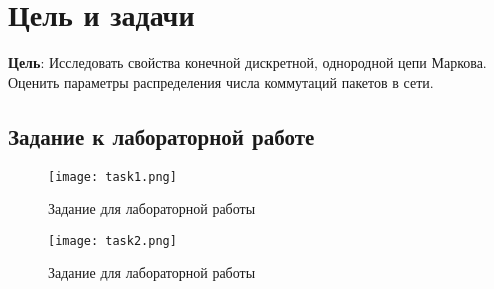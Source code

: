\chapter{Цель и задачи}
\label{ch:intro}

\textbf{Цель}: Исследовать свойства конечной дискретной,
однородной цепи Маркова. Оценить параметры распределения числа
коммутаций пакетов в сети.

\section*{Задание к лабораторной работе}

\begin{figure}[H]
    \centering
    \texttt{[image: task1.png]}
    \caption{Задание для лабораторной работы}
\end{figure}

\begin{figure}[H]
    \centering
    \texttt{[image: task2.png]}
    \caption{Задание для лабораторной работы}
\end{figure}

\endinput
